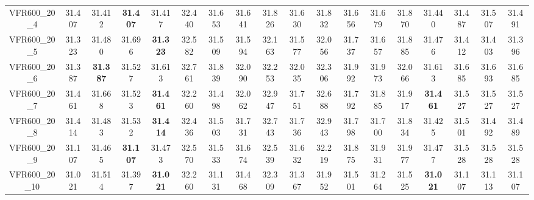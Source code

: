 \begin{tabular}{cc|ccc|ccccccccccccc}
VFR600\_20\_4      & 31.407           & 31.412           & {\bf 31.407}     & 31.417           & 32.440           & 31.653           & 31.641           & 31.826           & 31.630           & 31.832           & 31.656           & 31.679           & 31.870           & 31.440           & 31.487           & 31.507           & 31.491          \\ 
VFR600\_20\_5      & 31.323           & 31.480           & 31.696           & {\bf 31.323}     & 32.582           & 31.509           & 31.594           & 32.163           & 31.577           & 32.056           & 31.737           & 31.657           & 31.885           & 31.476           & 31.412           & 31.403           & 31.396          \\ 
VFR600\_20\_6      & 31.387           & {\bf 31.387}     & 31.527           & 31.613           & 32.761           & 31.839           & 32.090           & 32.253           & 32.035           & 32.306           & 31.992           & 31.973           & 32.066           & 31.613           & 31.685           & 31.693           & 31.685          \\ 
VFR600\_20\_7      & 31.461           & 31.668           & 31.523           & {\bf 31.461}     & 32.260           & 31.498           & 32.062           & 32.947           & 31.751           & 32.688           & 31.792           & 31.885           & 31.917           & {\bf 31.461}     & 31.527           & 31.527           & 31.527          \\ 
VFR600\_20\_8      & 31.414           & 31.483           & 31.532           & {\bf 31.414}     & 32.436           & 31.503           & 31.731           & 32.743           & 31.736           & 32.943           & 31.798           & 31.700           & 31.834           & 31.425           & 31.501           & 31.492           & 31.489          \\ 
VFR600\_20\_9      & 31.107           & 31.465           & {\bf 31.107}     & 31.473           & 32.570           & 31.533           & 31.674           & 32.539           & 31.632           & 32.219           & 31.875           & 31.931           & 31.977           & 31.477           & 31.528           & 31.528           & 31.528          \\ 
VFR600\_20\_10     & 31.021           & 31.514           & 31.397           & {\bf 31.021}     & 32.260           & 31.131           & 31.468           & 32.309           & 31.367           & 31.952           & 31.501           & 31.264           & 31.525           & {\bf 31.021}     & 31.107           & 31.113           & 31.107          \\ 

\end{tabular}
